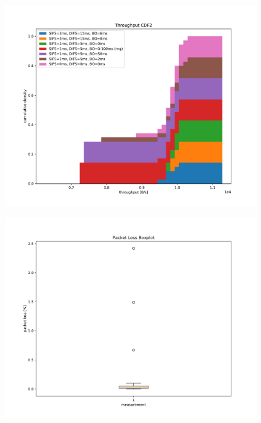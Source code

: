 \documentclass{article}
\begin{document}
\begin{figure}
	\includegraphics[width=\textwidth]{cdf2/throughput_cdf2}
\end{figure}

\begin{figure}
	\includegraphics[width=\textwidth]{boxplot/packet_loss_boxplot}
\end{figure}
\end{document}

